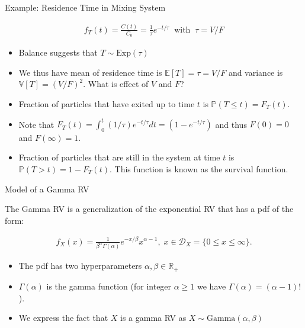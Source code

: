 \documentclass[9pt]{beamer}
\begin{document}
%
\begin{frame}{Example: Residence Time in Mixing System}

\begin{block}{}
\begin{align}
f_T(t)=\frac{C(t)}{C_0}= \frac{1}{\tau}e^{-t/\tau}\;\; \textrm{with}\;\; \tau=V/F
\end{align}
\end{block}
\begin{itemize}
\item Balance suggests that $T\sim\textrm{Exp}(\tau)$  
\item We thus have mean of residence time is $\mathbb{E}[T]=\tau=V/F$ and variance is $\mathbb{V}[T]=(V/F)^2$.  What is effect of $V$ and $F$? 
\item Fraction of particles that have exited up to time $t$ is $\mathbb{P}(T\leq t)=F_T(t)$. 
\item Note that $F_T(t)=\int_{0}^t(1/\tau)e^{-t/\tau}dt=(1-e^{-t/\tau})$ and thus $F(0)=0$ and $F(\infty)=1$.
\item Fraction of particles that are still in the system at time $t$  is $\mathbb{P}(T>t)=1-F_T(t)$. This function is known as the survival function. 
\end{itemize}
\end{frame}

%
\begin{frame}{Model of a Gamma RV}

The Gamma RV is a generalization of the exponential RV that has a pdf of the form:
\begin{block}{}
\begin{align*}
f_X(x)=\frac{1}{\beta^\alpha \Gamma(\alpha)}e^{-x/\beta}x^{\alpha-1},\; x\in \mathcal{D}_X=\{0\leq x\leq \infty\}.
\end{align*}
\end{block}
\begin{itemize}
\item The pdf has two hyperparameters $\alpha,\beta\in \mathbb{R}_+$
\item $\Gamma(\alpha)$ is the gamma function (for integer $\alpha\geq 1$ we have $\Gamma(\alpha)=(\alpha-1)!$). 
\item We express the fact that $X$ is a gamma RV as $X\sim \textrm{Gamma}(\alpha,\beta)$
\end{itemize}

\end{frame}
\end{document}
